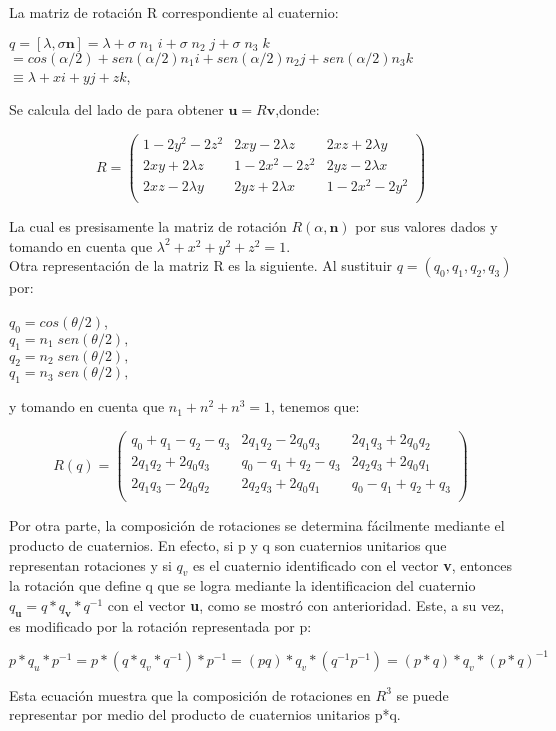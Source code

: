 \documentclass[12pt,a4paper]{report}
\begin{document}
La matriz de rotación R correspondiente al cuaternio:
\begin{center}
$q=[\lambda,\sigma\textbf{n}]=\lambda+\sigma\;n_{1}\;i+\sigma\;n_{2}\;j+\sigma\;n_{3}\;k$\\
$=cos(\alpha/2)+sen(\alpha/2)n_{1}i+sen(\alpha/2)n_{2}j+sen(\alpha/2)n_{3}k$\\
$\equiv\lambda+xi+yj+zk$,
\end{center}
Se calcula del lado de para obtener $\textbf{u}=R\textbf{v}$,donde:
\begin{center}
\[R=\begin{pmatrix}
1-2y^{2}-2z^{2} & 2xy-2\lambda z & 2xz+2\lambda y\\
2xy+2\lambda z  & 1-2x^{2}-2z^{2}& 2yz-2\lambda x\\
2xz-2\lambda y  & 2yz+2\lambda x  & 1-2x^{2}-2y^{2}\\
\end{pmatrix}
\]
\end{center}
La cual es presisamente la matriz de rotación $R(\alpha,\textbf{n})$ por sus valores dados y tomando en cuenta que $\lambda^{2}+x^{2}+y^{2}+z^{2}=1$.\\
Otra representación de la matriz R es la siguiente. Al sustituir $q=(q_{0},q_{1},q_{2},q_{3})$ por:
\begin{center}
$q_{0}=cos(\theta/2)$,\\
$q_{1}=n_{1}\;sen(\theta/2),$\\
$q_{2}=n_{2}\;sen(\theta/2),$\\
$q_{1}=n_{3}\;sen(\theta/2),$\\
\end{center}
y tomando en cuenta que $n_{1}+n^{2}+n^{3}=1$, tenemos que:
\begin{center}
\[R(q)=\begin{pmatrix}
q_{0}+q_{1}-q_{2}-q_{3} & 2q_{1}q_{2}-2q_{0}q_{3} & 2q_{1}q_{3}+2q_{0}q_{2}\\
2q_{1}q_{2}+2q_{0}q_{3} & q_{0}-q_{1}+q_{2}-q_{3} & 2q_{2}q_{3}+2q_{0}q_{1}\\
2q_{1}q_{3}-2q_{0}q_{2} & 2q_{2}q_{3}+2q_{0}q_{1} & q_{0}-q_{1}+q_{2}+q_{3}\\
\end{pmatrix}
\]
\end{center}
Por otra parte, la composición de rotaciones se determina fácilmente mediante el producto de cuaternios. En efecto, si p y q son cuaternios unitarios que representan rotaciones y si $q_{v}$ es el cuaternio identificado con el vector \textbf{v}, entonces la rotación que define q que se logra mediante la identificacion del cuaternio $q_{\textbf{u}}=q*q_{\textbf{v}}*q^{-1}$ con el vector \textbf{u}, como se mostró con anterioridad. Este, a su vez, es modificado por la rotación representada por p:
\begin{center}
$p*q_{u}*p^{-1}=p*(q*q_{v}*q^{-1})*p^{-1}=(pq)*q_{v}*(q^{-1}p^{-1})=(p*q)*q_{v}*(p*q)^{-1}$
\end{center}
Esta ecuación muestra que la composición de rotaciones en $R^{3}$ se puede representar por medio del producto de cuaternios unitarios p*q.\\\\
\end{document}
